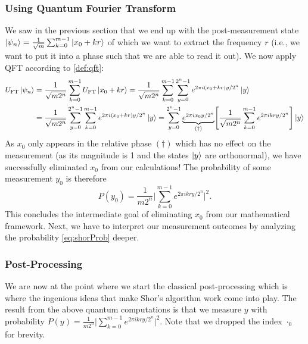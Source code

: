 			\subsubsection{Using Quantum Fourier Transform}
				We saw in the previous section that we end up with the post-measurement state \( \ket{\psi_n} = \frac{1}{\sqrt{m}} \sum_{k = 0}^{m - 1} \ket{x_0 + kr} \) of which we want to extract the frequency \(r\) (i.e., we want to put it into a phase such that we are able to read it out). We now apply \ac{QFT} according to \autoref{def:qft}:
				\begin{align}
					U_\mathrm{FT} \ket{\psi_n}
					 & = \frac{1}{\sqrt{m 2^n}} \sum_{k = 0}^{m - 1} U_\mathrm{FT} \ket{x_0 + kr}
					= \frac{1}{\sqrt{m 2^n}} \sum_{k = 0}^{m - 1} \sum_{y = 0}^{2^n - 1} e^{2 \pi i (x_0 + kr) y / 2^n} \ket{y}    \\
					 & = \frac{1}{\sqrt{m 2^n}} \sum_{y = 0}^{2^n - 1} \sum_{k = 0}^{m - 1} e^{2 \pi i (x_0 + kr) y / 2^n} \ket{y}
					= \sum_{y = 0}^{2^n - 1} \underbrace{e^{2 \pi i x_0 y / 2^n}}_{(\dagger)} \Biggl[ \frac{1}{\sqrt{m 2^n}} \sum_{k = 0}^{m - 1} e^{2 \pi i k r y / 2^n} \Biggr] \ket{y}
				\end{align}
				As \(x_0\) only appears in the relative phase \((\dagger)\) which has no effect on the measurement (as its magnitude is \num{1} and the states \(\ket{y}\) are orthonormal), we have successfully eliminated \(x_0\) from our calculations! The probability of some measurement \(y_0\) is therefore
				\begin{equation}
					P(y_0) = \frac{1}{m 2^n} \Biggl\lvert \sum_{k = 0}^{m - 1} e^{2 \pi i k r y / 2^n} \Biggr\rvert^2.  \label{eq:shorProb}
				\end{equation}
				This concludes the intermediate goal of eliminating \(x_0\) from our mathematical framework. Next, we have to interpret our measurement outcomes by analyzing the probability \eqref{eq:shorProb} deeper.

			\subsubsection{Post-Processing}
				We are now at the point where we start the classical post-processing which is where the ingenious ideas that make Shor's algorithm work come into play. The result from the above quantum computations is that we measure \(y\) with probability \( P(y) = \frac{1}{m 2^n} \bigl\lvert \sum_{k = 0}^{m - 1} e^{2 \pi i k r y / 2^n} \bigr\rvert^2 \). Note that we dropped the index \(\cdot_0\) for brevity.

